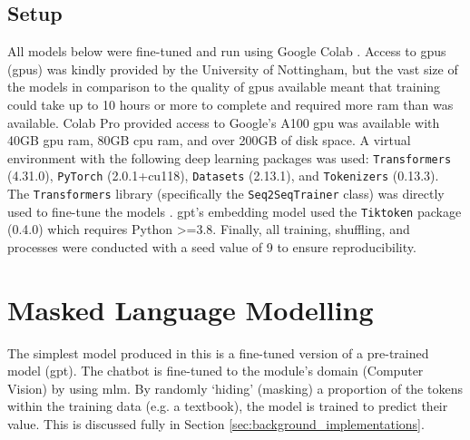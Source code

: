\subsection{Setup} \label{sec:design_setup}
All models below were fine-tuned and run using Google Colab \citep{Bisong2019}. Access to \acrlong{gpu}s (\acrshort{gpu}s) was kindly provided by the University of Nottingham, but the vast size of the models in comparison to the quality of \acrshort{gpu}s available meant that training could take up to 10 hours or more to complete and required more \acrshort{ram} than was available. Colab Pro provided access to Google's A100 \acrshort{gpu} was available with 40GB \acrshort{gpu} \acrshort{ram}, 80GB \acrshort{cpu} \acrshort{ram}, and over 200GB of disk space. A virtual environment with the following deep learning packages was used:  \texttt{Transformers} (4.31.0), \texttt{PyTorch} (2.0.1+cu118), \texttt{Datasets} (2.13.1), and \texttt{Tokenizers} (0.13.3). The  \texttt{Transformers} library (specifically the \texttt{Seq2SeqTrainer} class) was directly used to fine-tune the models \citep{wolf2020huggingfaces}. \acrshort{gpt}'s embedding model used the \texttt{Tiktoken} package (0.4.0) which requires Python >=3.8. Finally, all training, shuffling, and processes were conducted with a seed value of 9 to ensure reproducibility.

\section{Masked Language Modelling}\label{sec:methodology_mlm}
The simplest model produced in this \papertype is a fine-tuned version of a pre-trained model (\acrshort{gpt}). The chatbot is fine-tuned to the module's domain (Computer Vision) by using \acrfull{mlm}. By randomly `hiding' (masking) a proportion of the tokens within the training data (e.g. a textbook), the model is trained to predict their value. This is discussed fully in Section \ref{sec:background_implementations}.

